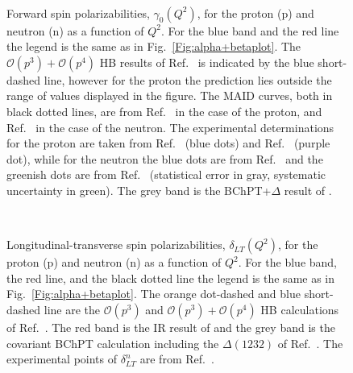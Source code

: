 \documentclass[prc,twocolumn,showpacs,preprintnumbers,amsmath,amssymb
,superscriptaddress,a4paper,nofootinbib
]{revtex4-1}
\begin{document}
\begin{figure}[t]
\begin{center}
\hspace{-0.3cm}\\
 \hspace{-0.3cm}
\caption{Forward spin polarizabilities, $\gamma_0(Q^2)$, for the proton (p) and neutron (n) as a function of $Q^2$. 
For the blue band and the red line the legend is the same as in Fig.~\ref{Fig:alpha+betaplot}. The $\mathcal{O}(p^3)+\mathcal{O}(p^4)$ HB results of Ref.~\cite{Kao:2002cp} is indicated by the blue short-dashed line, however for the proton the prediction lies outside the range of values displayed in the figure. 
The MAID curves, both in black dotted lines, are from Ref.~\cite{Drechsel:2002ar} in the case of the proton, and Ref.~\cite{Amarian:2004yf} in the case of the neutron. 
The experimental determinations for the proton are taken from Ref.~\cite{Prok:2008ev} (blue dots) and Ref.~\cite{Dutz:2003mm} (purple dot), while for the neutron the blue dots are from Ref.~\cite{Amarian:2004yf} and the greenish dots are from Ref.~\cite{Guler:2015} (statistical error in gray, systematic uncertainty in green). The grey band is the BChPT+$\Delta$ result of \cite{Bernard:2012hb}. \label{Fig:gamma0plot} }
\end{center}
\end{figure}



\begin{figure}[t]
\begin{center}
\hspace{-0.3cm} \\\hspace{-0.3cm} 
\caption{Longitudinal-transverse spin polarizabilities, $\delta_{LT}(Q^2)$, for the proton (p) and neutron (n) as a function of $Q^2$. 
For the blue band, the red line, and the black dotted line the legend is the same as in Fig.~\ref{Fig:alpha+betaplot}. 
The orange dot-dashed and blue short-dashed line are the $\mathcal{O}(p^3)$ and $\mathcal{O}(p^3)+\mathcal{O}(p^4)$ HB calculations of Ref.~\cite{Kao:2002cp}. The red band is the IR result of \cite{Bernard:2002pw} and the grey band is the covariant BChPT calculation including the $\Delta(1232)$ of Ref.~\cite{Bernard:2012hb}. 
The experimental points of $\delta^n_{LT}$ are from Ref.~\cite{Amarian:2004yf}.\label{Fig:deltaLTplot}}
\end{center}
\end{figure}
\end{document}
